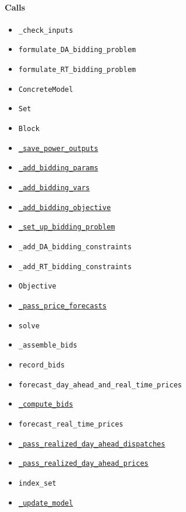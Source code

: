 \documentclass[11pt]{report}
\begin{document}
\paragraph{Calls}
\begin{itemize}[leftmargin=*]
  \item \texttt{\_check\_inputs}
  \item \texttt{formulate\_DA\_bidding\_problem}
  \item \texttt{formulate\_RT\_bidding\_problem}
  \item \texttt{ConcreteModel}
  \item \texttt{Set}
  \item \texttt{Block}
  \item \hyperref[def:bidder.py:StochasticProgramBidder._save_power_outputs:L339]{\texttt{\_save\_power\_outputs}}
  \item \hyperref[def:bidder.py:StochasticProgramBidder._add_bidding_params:L360]{\texttt{\_add\_bidding\_params}}
  \item \hyperref[def:bidder.py:StochasticProgramBidder._add_bidding_vars:L385]{\texttt{\_add\_bidding\_vars}}
  \item \hyperref[def:bidder.py:StochasticProgramBidder._add_bidding_objective:L418]{\texttt{\_add\_bidding\_objective}}
  \item \hyperref[def:bidder.py:StochasticProgramBidder._set_up_bidding_problem:L275]{\texttt{\_set\_up\_bidding\_problem}}
  \item \texttt{\_add\_DA\_bidding\_constraints}
  \item \texttt{\_add\_RT\_bidding\_constraints}
  \item \texttt{Objective}
  \item \hyperref[def:bidder.py:StochasticProgramBidder._pass_price_forecasts:L724]{\texttt{\_pass\_price\_forecasts}}
  \item \texttt{solve}
  \item \texttt{\_assemble\_bids}
  \item \texttt{record\_bids}
  \item \texttt{forecast\_day\_ahead\_and\_real\_time\_prices}
  \item \hyperref[def:bidder.py:StochasticProgramBidder._compute_bids:L456]{\texttt{\_compute\_bids}}
  \item \texttt{forecast\_real\_time\_prices}
  \item \hyperref[def:bidder.py:StochasticProgramBidder._pass_realized_day_ahead_dispatches:L622]{\texttt{\_pass\_realized\_day\_ahead\_dispatches}}
  \item \hyperref[def:bidder.py:StochasticProgramBidder._pass_realized_day_ahead_prices:L584]{\texttt{\_pass\_realized\_day\_ahead\_prices}}
  \item \texttt{index\_set}
  \item \hyperref[def:bidder.py:StochasticProgramBidder._update_model:L675]{\texttt{\_update\_model}}
\end{itemize}
\end{document}
